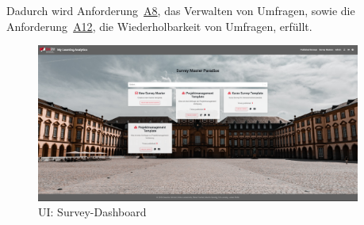 Dadurch wird Anforderung~\hyperref[Anf:A8]{A8}, das Verwalten von Umfragen, sowie die Anforderung~\hyperref[Anf:A12]{A12}, die Wiederholbarkeit von Umfragen, erfüllt.

\begin{figure}[!htb]
	\centering
	\includegraphics[width=0.95\textwidth, keepaspectratio]{img/client/SurveyMaster.png}
	\captionsetup{justification=centering, format=plain}
	\caption[\acl{UI}: Survey-Dashboard]{\acl{UI}: Survey-Dashboard \\ \quelleScreenshot}
	\label{fig:SurveyMasterDashboard}
\end{figure}
